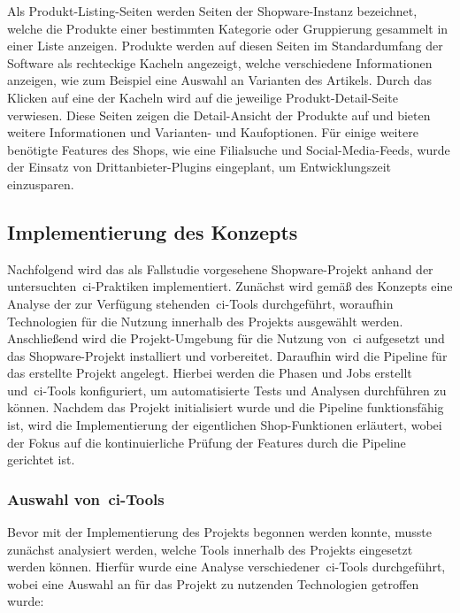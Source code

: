 Als Produkt-Listing-Seiten werden Seiten der Shopware-Instanz bezeichnet, welche die Produkte einer bestimmten
Kategorie oder Gruppierung gesammelt in einer Liste anzeigen.
Produkte werden auf diesen Seiten im Standardumfang der Software als rechteckige Kacheln angezeigt, welche
verschiedene Informationen anzeigen, wie zum Beispiel eine Auswahl an Varianten des Artikels.
Durch das Klicken auf eine der Kacheln wird auf die jeweilige Produkt-Detail-Seite verwiesen.
Diese Seiten zeigen die Detail-Ansicht der Produkte auf und bieten weitere Informationen und Varianten- und
Kaufoptionen.
Für einige weitere benötigte Features des Shops, wie eine Filialsuche und Social-Media-Feeds, wurde der Einsatz von
Drittanbieter-Plugins eingeplant, um Entwicklungszeit einzusparen.

\subsection{Implementierung des Konzepts} \label{subsec:04-implementation-2}

Nachfolgend wird das als Fallstudie vorgesehene Shopware-Projekt anhand der untersuchten\ \acrshort{ci}-Praktiken
implementiert.
Zunächst wird gemäß des Konzepts eine Analyse der zur Verfügung stehenden\ \acrshort{ci}-Tools durchgeführt,
woraufhin Technologien für die Nutzung innerhalb des Projekts ausgewählt werden.
Anschließend wird die Projekt-Umgebung für die Nutzung von\ \acrshort{ci} aufgesetzt und das Shopware-Projekt
installiert und vorbereitet.
Daraufhin wird die Pipeline für das erstellte Projekt angelegt.
Hierbei werden die Phasen und Jobs erstellt und\ \acrshort{ci}-Tools konfiguriert, um automatisierte Tests und Analysen
durchführen zu können.
Nachdem das Projekt initialisiert wurde und die Pipeline funktionsfähig ist, wird die Implementierung der eigentlichen
Shop-Funktionen erläutert, wobei der Fokus auf die kontinuierliche Prüfung der Features durch die Pipeline gerichtet
ist.

\subsubsection{Auswahl von\ \acrshort{ci}-Tools}

Bevor mit der Implementierung des Projekts begonnen werden konnte, musste zunächst analysiert werden, welche Tools
innerhalb des Projekts eingesetzt werden können.
Hierfür wurde eine Analyse verschiedener\ \acrshort{ci}-Tools durchgeführt, wobei eine Auswahl an für das
Projekt zu nutzenden Technologien getroffen wurde:\\

